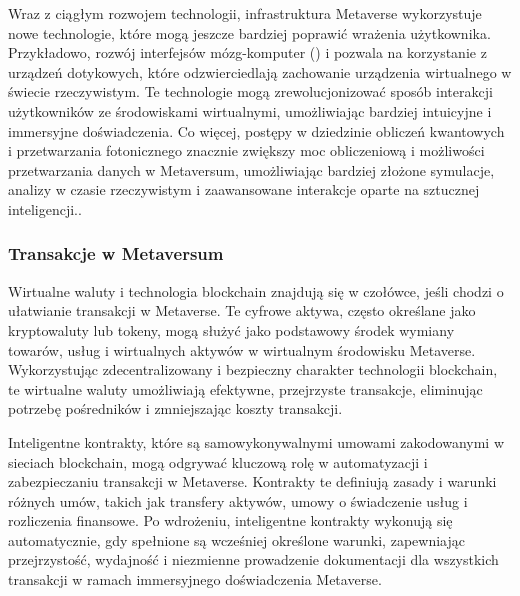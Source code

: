 Wraz z ciągłym rozwojem technologii, infrastruktura Metaverse wykorzystuje nowe technologie, które mogą jeszcze bardziej poprawić wrażenia użytkownika. Przykładowo, rozwój interfejsów mózg-komputer  () i pozwala na korzystanie z urządzeń dotykowych, które odzwierciedlają zachowanie urządzenia wirtualnego w świecie rzeczywistym. Te technologie mogą zrewolucjonizować sposób interakcji użytkowników ze środowiskami wirtualnymi, umożliwiając bardziej intuicyjne i immersyjne doświadczenia. Co więcej, postępy w dziedzinie obliczeń kwantowych i przetwarzania fotonicznego znacznie zwiększy moc obliczeniową i możliwości przetwarzania danych w Metaversum, umożliwiając bardziej złożone symulacje, analizy w czasie rzeczywistym i zaawansowane interakcje oparte na sztucznej inteligencji.\cite{metaverseInfrastructureIEEE}.

\subsubsection{Transakcje w Metaversum}

Wirtualne waluty i technologia blockchain znajdują się w czołówce, jeśli chodzi o ułatwianie transakcji w Metaverse. Te cyfrowe aktywa, często określane jako kryptowaluty lub tokeny, mogą służyć jako podstawowy środek wymiany towarów, usług i wirtualnych aktywów w wirtualnym środowisku Metaverse. Wykorzystując zdecentralizowany i bezpieczny charakter technologii blockchain, te wirtualne waluty umożliwiają efektywne, przejrzyste transakcje, eliminując potrzebę pośredników i zmniejszając koszty transakcji\cite{metaverseInfrastructureIEEE}.

Inteligentne kontrakty, które są samowykonywalnymi umowami zakodowanymi w sieciach blockchain, mogą odgrywać kluczową rolę w automatyzacji i zabezpieczaniu transakcji w Metaverse. Kontrakty te definiują zasady i warunki różnych umów, takich jak transfery aktywów, umowy o świadczenie usług i rozliczenia finansowe. Po wdrożeniu, inteligentne kontrakty wykonują się automatycznie, gdy spełnione są wcześniej określone warunki, zapewniając przejrzystość, wydajność i niezmienne prowadzenie dokumentacji dla wszystkich transakcji w ramach immersyjnego doświadczenia Metaverse\cite{metaverseInfrastructureIEEE}.

